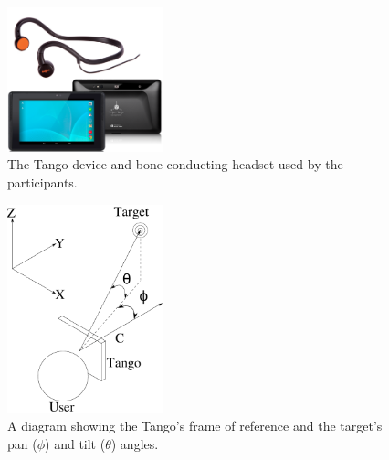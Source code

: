 \documentclass[sigconf, review=true, screen=true, anonymous=true]{acmart}
\begin{document}
\begin{figure}
  \centering
  \includegraphics[width=0.4\textwidth]{figures/tango_headphone.png}
  \caption{The Tango device and bone-conducting headset used by the participants. }
  \label{fig:tango-headphone}
\end{figure}
\begin{figure}
  \centering
  \includegraphics[width=0.4\textwidth]{figures/camera_coordinate.pdf}
  \caption{A diagram showing the Tango's frame of reference and the target's pan ($\phi$) and tilt ($\theta$) angles.}
  \label{fig:cam-coords}
\end{figure}
\end{document}
